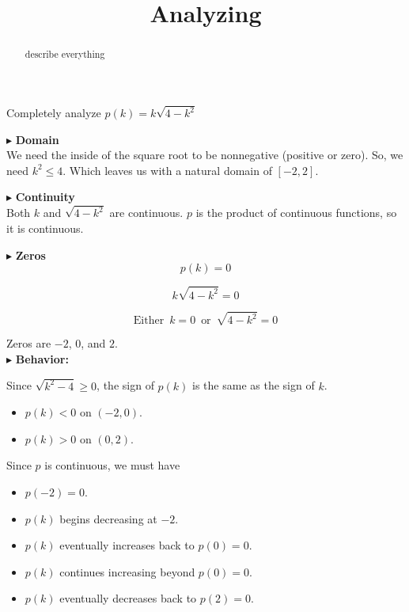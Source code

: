 \documentclass{ximera}
\title{Analyzing}
\begin{document}
\begin{abstract}
describe everything
\end{abstract}
\maketitle







Completely analyze $p(k) = k \sqrt{4-k^2}$






$\blacktriangleright$  \textbf{\textcolor{blue!55!black}{Domain}} \\

We need the inside of the square root to be nonnegative (positive or zero).  So, we need $k^2 \leq 4$. Which leaves us with a natural domain of $[-2, 2]$.





$\blacktriangleright$  \textbf{\textcolor{blue!55!black}{Continuity}} \\

Both $k$ and $\sqrt{4 - k^2}$ are continuous.  $p$ is the product of continuous functions, so it is continuous.



$\blacktriangleright$  \textbf{\textcolor{blue!55!black}{Zeros}} \\


\[  p(k) = 0   \]

\[  k \sqrt{4-k^2} = 0  \]

\[
\text{Either } \, k = 0 \, \text{ or } \, \sqrt{4-k^2} = 0
\]


Zeros are $-2$, $0$, and $2$. \\




$\blacktriangleright$ \textbf{Behavior:} 


Since $\sqrt{k^2 - 4} \geq 0$, the sign of $p(k)$ is the same as the sign of $k$.

\begin{itemize}
\item  $p(k) < 0$ on $(-2, 0)$.
\item  $p(k) > 0$ on $(0, 2)$.
\end{itemize}


Since $p$ is continuous, we must have 


\begin{itemize}
\item  $p(-2) = 0$.
\item  $p(k)$ begins decreasing at $-2$.
\item  $p(k)$ eventually increases back to $p(0) = 0$.
\item  $p(k)$ continues increasing beyond $p(0) = 0$.
\item  $p(k)$ eventually decreases back to $p(2) = 0$.
\end{itemize}
\end{document}
